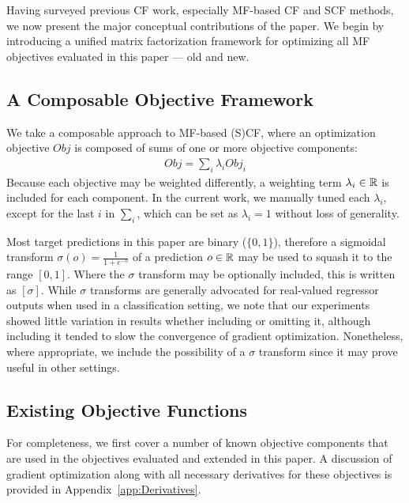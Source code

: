 Having surveyed previous CF work, especially MF-based CF and SCF
methods, we now present the major conceptual contributions of the
paper.  We begin by introducing a unified
matrix factorization framework for optimizing all MF objectives
evaluated in this paper --- old and new.

\subsection{A Composable Objective Framework}


We take a composable approach to MF-based (S)CF, where an optimization
objective $\mathit{Obj}$ is composed of sums of one or more objective
components:
\begin{align}
\mathit{Obj} = \sum_i \lambda_i \mathit{Obj}_i
\end{align}
Because each objective may be weighted differently, a weighting term
$\lambda_i \in \mathbb{R}$ is included for each component.  In the current work,
we manually tuned each $\lambda_i$, except for the last $i$ in $\sum_i$,
which can be set as $\lambda_i = 1$ without loss of generality.

Most target predictions in this paper are binary ($\{0,1\}$),
therefore a sigmoidal transform $\sigma(o) = \frac{1}{1 + e^{-o}}$ of
a prediction $o \in \mathbb{R}$ may be used to squash it to the range $[0,
1]$.  Where the $\sigma$ transform may be optionally
included, this is written as $[\sigma]$.  While $\sigma$ transforms
are generally advocated for real-valued regressor outputs when used in
a classification setting, we note that our experiments showed little
variation in results whether including or omitting it, although
including it tended to slow the convergence of gradient optimization.
Nonetheless, where appropriate, we include the possibility of a
$\sigma$ transform since it may prove useful in other settings.

\subsection{Existing Objective Functions}

For completeness, we first cover a number of known objective
components that are used in the objectives evaluated and
extended in this paper.  A discussion of gradient optimization along
with all necessary derivatives for these objectives is provided in
Appendix~\ref{app:Derivatives}.

